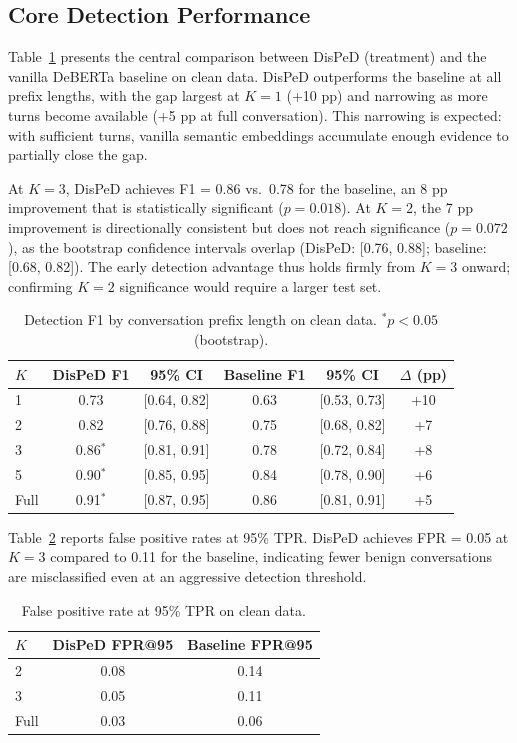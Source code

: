 \documentclass[11pt,a4paper]{article}
\begin{document}
\subsection{Core Detection Performance}
\label{sec:core}

Table~\ref{tab:core} presents the central comparison between DisPeD (treatment) and the vanilla DeBERTa baseline on clean data.
DisPeD outperforms the baseline at all prefix lengths, with the gap largest at $K{=}1$ (+10 pp) and narrowing as more turns become available (+5 pp at full conversation).
This narrowing is expected: with sufficient turns, vanilla semantic embeddings accumulate enough evidence to partially close the gap.

At $K{=}3$, DisPeD achieves F1 = 0.86 vs.\ 0.78 for the baseline, an 8 pp improvement that is statistically significant ($p{=}0.018$).
At $K{=}2$, the 7 pp improvement is directionally consistent but does not reach significance ($p{=}0.072$), as the bootstrap confidence intervals overlap (DisPeD: [0.76, 0.88]; baseline: [0.68, 0.82]).
The early detection advantage thus holds firmly from $K{=}3$ onward; confirming $K{=}2$ significance would require a larger test set.

\begin{table}[t]
\centering
\small
\caption{Detection F1 by conversation prefix length on clean data. $^*p{<}0.05$ (bootstrap).}
\label{tab:core}
\begin{tabular}{lccccc}
\toprule
$K$ & \textbf{DisPeD F1} & \textbf{95\% CI} & \textbf{Baseline F1} & \textbf{95\% CI} & \textbf{$\Delta$ (pp)} \\
\midrule
1 & 0.73 & [0.64, 0.82] & 0.63 & [0.53, 0.73] & +10 \\
2 & 0.82 & [0.76, 0.88] & 0.75 & [0.68, 0.82] & +7 \\
3 & 0.86$^*$ & [0.81, 0.91] & 0.78 & [0.72, 0.84] & +8 \\
5 & 0.90$^*$ & [0.85, 0.95] & 0.84 & [0.78, 0.90] & +6 \\
Full & 0.91$^*$ & [0.87, 0.95] & 0.86 & [0.81, 0.91] & +5 \\
\bottomrule
\end{tabular}
\end{table}

Table~\ref{tab:fpr} reports false positive rates at 95\% TPR.
DisPeD achieves FPR = 0.05 at $K{=}3$ compared to 0.11 for the baseline, indicating fewer benign conversations are misclassified even at an aggressive detection threshold.

\begin{table}[t]
\centering
\small
\caption{False positive rate at 95\% TPR on clean data.}
\label{tab:fpr}
\begin{tabular}{lcc}
\toprule
$K$ & \textbf{DisPeD FPR@95} & \textbf{Baseline FPR@95} \\
\midrule
2 & 0.08 & 0.14 \\
3 & 0.05 & 0.11 \\
Full & 0.03 & 0.06 \\
\bottomrule
\end{tabular}
\end{table}
\end{document}
